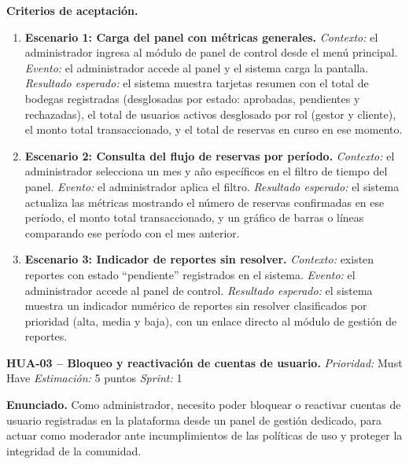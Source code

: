 \textbf{Criterios de aceptación.}
\begin{enumerate}
\item \textbf{Escenario 1: Carga del panel con métricas generales.} \textit{Contexto:} el administrador ingresa al módulo de panel de control desde el menú principal. \textit{Evento:} el administrador accede al panel y el sistema carga la pantalla. \textit{Resultado esperado:} el sistema muestra tarjetas resumen con el total de bodegas registradas (desglosadas por estado: aprobadas, pendientes y rechazadas), el total de usuarios activos desglosado por rol (gestor y cliente), el monto total transaccionado, y el total de reservas en curso en ese momento.
\item \textbf{Escenario 2: Consulta del flujo de reservas por período.} \textit{Contexto:} el administrador selecciona un mes y año específicos en el filtro de tiempo del panel. \textit{Evento:} el administrador aplica el filtro. \textit{Resultado esperado:} el sistema actualiza las métricas mostrando el número de reservas confirmadas en ese período, el monto total transaccionado, y un gráfico de barras o líneas comparando ese período con el mes anterior.
\item \textbf{Escenario 3: Indicador de reportes sin resolver.} \textit{Contexto:} existen reportes con estado ``pendiente'' registrados en el sistema. \textit{Evento:} el administrador accede al panel de control. \textit{Resultado esperado:} el sistema muestra un indicador numérico de reportes sin resolver clasificados por prioridad (alta, media y baja), con un enlace directo al módulo de gestión de reportes.
\end{enumerate}

\textbf{HUA-03 -- Bloqueo y reactivación de cuentas de usuario.} \label{req:HUA-03}
\textit{Prioridad:} Must Have \quad \textit{Estimación:} 5 puntos \quad \textit{Sprint:} 1

\textbf{Enunciado.} Como administrador, necesito poder bloquear o reactivar cuentas de usuario registradas en la plataforma desde un panel de gestión dedicado, para actuar como moderador ante incumplimientos de las políticas de uso y proteger la integridad de la comunidad.

